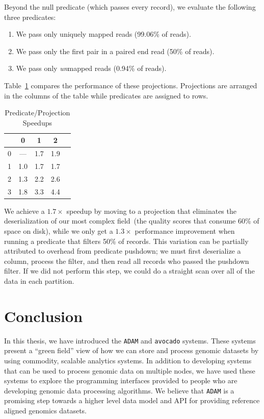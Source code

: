 \documentclass[masters]{ucbthesis}
\begin{document}
Beyond the null predicate (which passes every record), we evaluate the following three predicates:

\begin{enumerate}
\item We pass only uniquely mapped reads (99.06\% of reads).
\item We pass only the first pair in a paired end read (50\% of reads).
\item We pass only \emph{un}mapped reads (0.94\% of reads).
\end{enumerate}

Table~\ref{tab:ppp} compares the performance of these projections. Projections are arranged in the columns of the table
while predicates are assigned to rows.

\begin{table}[h]
\caption{Predicate/Projection Speedups}
\label{tab:ppp}
\begin{center}
\begin{tabular}{ l | c c c c }
\hline
& 0 & 1 & 2 \\
\hline
\hline
0 & --- & 1.7 & 1.9 \\
1 & 1.0 & 1.7 & 1.7 \\
2 & 1.3 & 2.2 & 2.6 \\
3 & 1.8 & 3.3 & 4.4 \\
\hline
\end{tabular}
\end{center}
\end{table}

We achieve a $1.7\times$ speedup by moving to a projection that eliminates the deserialization of our most
complex field~(the quality scores that consume 60\% of space on disk), while we only get a $1.3\times$
performance improvement when running a predicate that filters 50\% of records. This variation can be partially attributed
to overhead from predicate pushdown; we must first deserialize a column, process the filter, and then read all
records who passed the pushdown filter. If we did not perform this step, we could do a straight scan over all of
the data in each partition.

\chapter{Conclusion}

In this thesis, we have introduced the \texttt{ADAM} and \texttt{avocado} systems. These
systems present a ``green field'' view of how we can store and process genomic datasets
by using commodity, scalable analytics systems. In addition to developing systems that
can be used to process genomic data on multiple nodes, we have used these systems to
explore the programming interfaces provided to people who are developing genomic data
processing algorithms.  We believe that \texttt{ADAM} is a promising step towards a
higher level data model and API for providing reference aligned genomics datasets.
\end{document}
